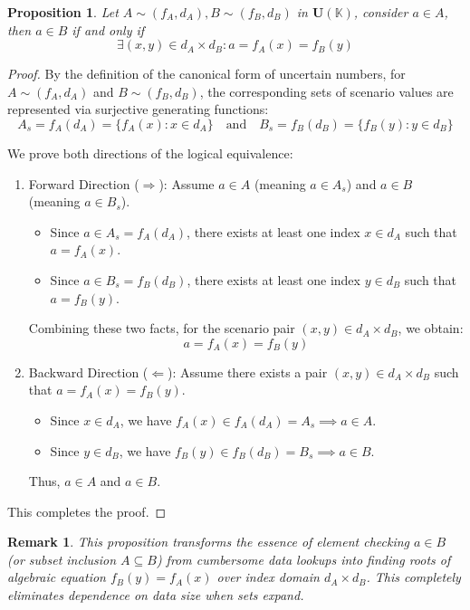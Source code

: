 \documentclass[a4paper,12pt, twoside]{memoir}
\newtheorem{proposition}{Proposition}[chapter]
\newtheorem{remark}{Remark}[chapter]
\newcommand{\tsbd}[1]{\mathbf{U}(\mathbb{#1})}
\begin{document}
\begin{proposition}
	Let $A \sim (f_A,d_A), B \sim (f_B,d_B)$ in $\tsbd{K}$, consider $a \in A$, then $a \in B$ if and only if
	\[
		\exists (x,y) \in d_A \times d_B : a=f_A(x)=f_B(y)
	\]
\end{proposition}
\begin{proof}
	By the definition of the canonical form of uncertain numbers, for $A \sim (f_A, d_A)$ and $B \sim (f_B, d_B)$, the corresponding sets of scenario values are represented via surjective generating functions:
	\[
		A_s = f_A(d_A) = \{f_A(x) : x \in d_A\} \quad \text{and} \quad B_s = f_B(d_B) = \{f_B(y) : y \in d_B\}
	\]

	We prove both directions of the logical equivalence:
	\begin{enumerate}[leftmargin=*]
		\item Forward Direction ($\Rightarrow$):
		      Assume $a \in A$ (meaning $a \in A_s$) and $a \in B$ (meaning $a \in B_s$).
		      \begin{itemize}
			      \item Since $a \in A_s = f_A(d_A)$, there exists at least one index $x \in d_A$ such that $a = f_A(x)$.
			      \item Since $a \in B_s = f_B(d_B)$, there exists at least one index $y \in d_B$ such that $a = f_B(y)$.
		      \end{itemize}
		      Combining these two facts, for the scenario pair $(x, y) \in d_A \times d_B$, we obtain:
		      \[
			      a = f_A(x) = f_B(y)
		      \]

		\item Backward Direction ($\Leftarrow$):
		      Assume there exists a pair $(x, y) \in d_A \times d_B$ such that $a = f_A(x) = f_B(y)$.
		      \begin{itemize}
			      \item Since $x \in d_A$, we have $f_A(x) \in f_A(d_A) = A_s \implies a \in A$.
			      \item Since $y \in d_B$, we have $f_B(y) \in f_B(d_B) = B_s \implies a \in B$.
		      \end{itemize}
		      Thus, $a \in A$ and $a \in B$.
	\end{enumerate}

	This completes the proof.
\end{proof}
\begin{remark}
	This proposition transforms the essence of element checking $a \in B$ (or subset inclusion $A \subseteq B$) from cumbersome data lookups into finding roots of algebraic equation $f_B(y) = f_A(x)$ over index domain $d_A \times d_B$. This completely eliminates dependence on data size when sets expand.
\end{remark}
\end{document}
